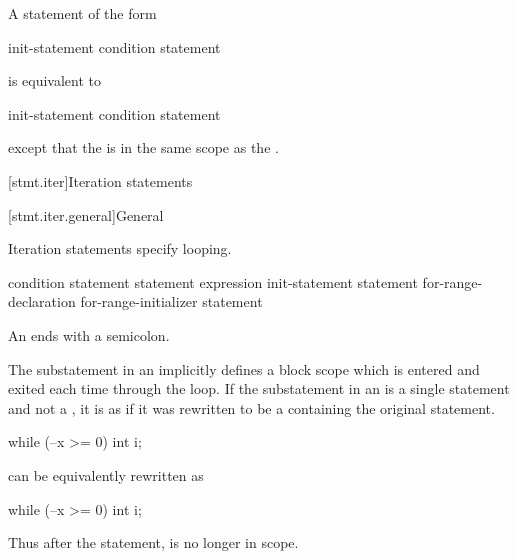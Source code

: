 \pnum
A  statement of the form
\begin{ncsimplebnf}
 \terminal{(} init-statement condition \terminal{)} statement
\end{ncsimplebnf}
is equivalent to
\begin{ncsimplebnf}
\terminal{\{}\br
\bnfindent init-statement\br
\bnfindent {} \terminal{(} condition \terminal{)} statement\br
\terminal{\}}
\end{ncsimplebnf}
except that the  is in
the same scope as the .


[stmt.iter]{Iteration statements}%

[stmt.iter.general]{General}%

\pnum
Iteration statements specify looping.

%
%
%
%
\begin{bnf}
\br
     \terminal{(} condition \terminal{)} statement\br
     statement  \terminal{(} expression \terminal{)} \terminal{;}\br
     \terminal{(} init-statement  \terminal{;}  \terminal{)} statement\br
     \terminal{(}  for-range-declaration \terminal{:} for-range-initializer \terminal{)} statement
\end{bnf}

\begin{note}
An  ends with a semicolon.
\end{note}

\pnum
{}%
The substatement in an  implicitly defines
a block scope which is entered and exited each time
through the loop.
If the substatement in an  is
a single statement and not a ,
it is as if it was rewritten to be
a  containing the original statement.
\begin{example}
\begin{codeblock}
while (--x >= 0)
  int i;
\end{codeblock}
can be equivalently rewritten as
\begin{codeblock}
while (--x >= 0) {
  int i;
}
\end{codeblock}
Thus after the  statement,  is no longer in scope.
\end{example}


